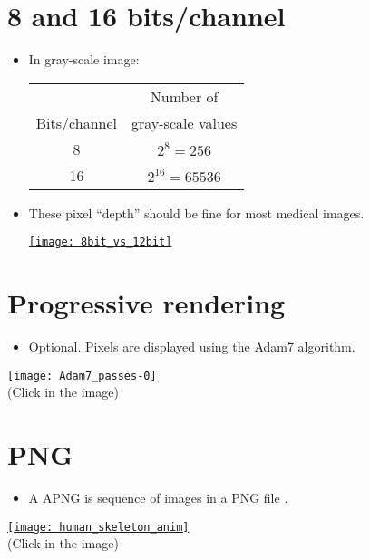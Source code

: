 \section{8 and 16 bits/channel}
\begin{itemize}
\item In gray-scale image:
  \begin{center}
    \begin{tabular}{c|c}
      & Number of \\
      Bits/channel & gray-scale values \\
      \hline
      8 & $2^8=256$ \\
      16 & $2^{16}=65536$
    \end{tabular}
  \end{center}
\item These pixel ``depth'' should be fine for most medical images.
  \begin{center}
    \href{https://www.fastcompression.com/blog/jpeg2000-applications-part1.htm}{\texttt{[image: 8bit\_vs\_12bit]}}
  \end{center}
\end{itemize}

\section{Progressive rendering}
\begin{itemize}
\item Optional. Pixels are displayed using the Adam7 algorithm.
\end{itemize}
\begin{center}
  \href{https://upload.wikimedia.org/wikipedia/commons/2/27/Adam7_passes.gif}{\texttt{[image: Adam7\_passes-0]}} \\
  (Click in the image)
\end{center}
  
\section{ PNG}
\begin{itemize}
\item A \gls{APNG} is sequence of images in a \gls{PNG} file
  \cite{wikipedia_APNG}.
\end{itemize}
\begin{center}
  \href{https://commons.wikimedia.org/wiki/Category:Animated_PNG_files#/media/File:201805_human_skeleton_anim.png}{\texttt{[image: human\_skeleton\_anim]}} \\
  (Click in the image)
\end{center}

